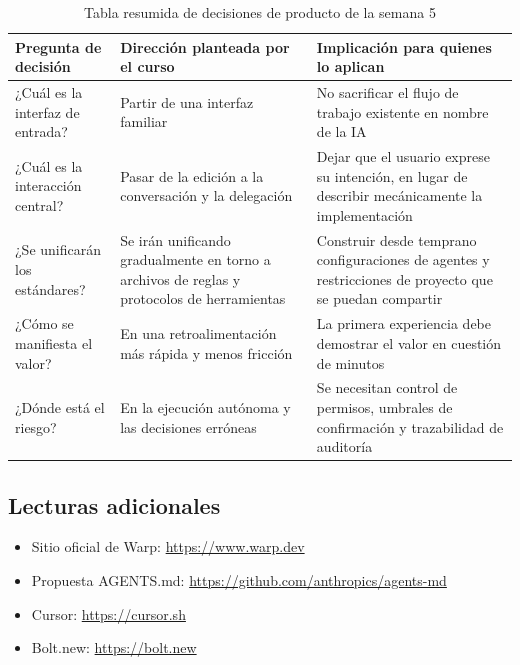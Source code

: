 \begin{table}[H]
\centering
\begin{tabular}{p{} p{} p{}}
\toprule
Pregunta de decisión & Dirección planteada por el curso & Implicación para quienes lo aplican \\
\midrule
¿Cuál es la interfaz de entrada? & Partir de una interfaz familiar & No sacrificar el flujo de trabajo existente en nombre de la IA \\
¿Cuál es la interacción central? & Pasar de la edición a la conversación y la delegación & Dejar que el usuario exprese su intención, en lugar de describir mecánicamente la implementación \\
¿Se unificarán los estándares? & Se irán unificando gradualmente en torno a archivos de reglas y protocolos de herramientas & Construir desde temprano configuraciones de agentes y restricciones de proyecto que se puedan compartir \\
¿Cómo se manifiesta el valor? & En una retroalimentación más rápida y menos fricción & La primera experiencia debe demostrar el valor en cuestión de minutos \\
¿Dónde está el riesgo? & En la ejecución autónoma y las decisiones erróneas & Se necesitan control de permisos, umbrales de confirmación y trazabilidad de auditoría \\
\bottomrule
\end{tabular}
\caption{Tabla resumida de decisiones de producto de la semana 5}
\end{table}

\subsection{Lecturas adicionales}

\begin{itemize}
    \item Sitio oficial de Warp: \url{https://www.warp.dev}
    \item Propuesta AGENTS.md: \url{https://github.com/anthropics/agents-md}
    \item Cursor: \url{https://cursor.sh}
    \item Bolt.new: \url{https://bolt.new}
\end{itemize}



